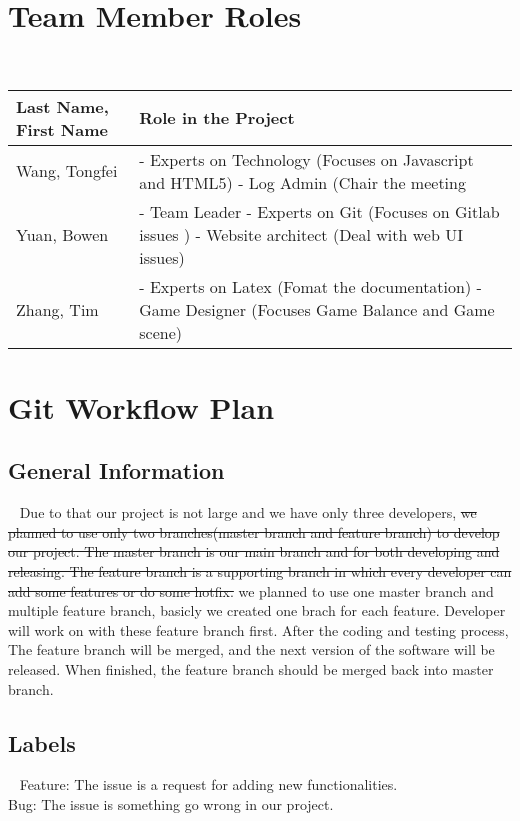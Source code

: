 \documentclass[12pt]{article}
\newcommand\tab[1][1cm]{\hspace*{#1}}
\begin{document}
\section{Team Member Roles}
~\newline
\begin{tabular}{| l | p{9.5cm} |}
\hline
\textbf{Last Name, First Name} & \textbf{Role in the Project}\\
\hline
Wang, Tongfei  & 
- {\small Experts on Technology (Focuses on Javascript and HTML5)}  \newline
- {\small Log Admin (Chair the meeting} 

\\
\hline
Yuan, Bowen & 
- {\small Team Leader}  \newline
- {\small Experts on Git (Focuses on Gitlab issues ) } \newline
- {\small Website architect (Deal with web UI issues)}  
\\
\hline
Zhang, Tim  & 
- {\small Experts on Latex (Fomat the documentation) } \newline
- {\small Game Designer (Focuses Game Balance  and Game scene)} 
\\
\hline
\end{tabular}
\newpage
\section{Git Workflow Plan}
\tab
\subsection*{General Information}
~\newline
\tab Due to that our project is not large and we have only three developers, \st{we planned to use only two branches(master branch and feature branch) to develop our project. The master branch is our main branch and for both developing and releasing. The feature branch is a supporting branch in which every developer can add some features or do some hotfix.}{\color{red} we planned to use one master branch and multiple feature branch, basicly we created one brach for each feature. Developer will work on with these feature branch first. After the coding and testing process, The feature branch will be merged, and the next version of the software will be released.}
 When finished, the feature branch should be merged back into master branch.
\subsection*{Labels}
~\newline
\tab Feature: The issue is a request for adding new functionalities.\\
\tab Bug: The issue is something go wrong in our project.
~\tab
\end{document}
